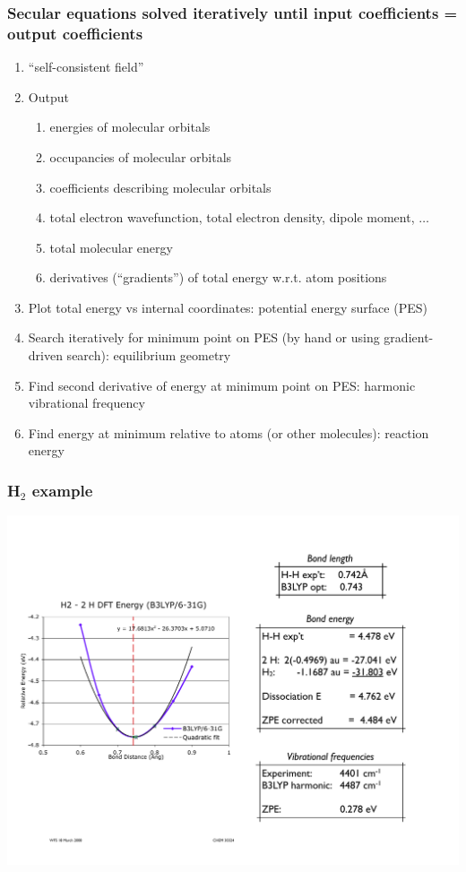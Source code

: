 \documentclass[11pt]{article}
\begin{document}
\subsubsection{Secular equations solved iteratively until input coefficients = output coefficients}
\label{sec:org75608ea}
\begin{enumerate}
\item ``self-consistent field''
\item Output
\begin{enumerate}
\item energies of molecular orbitals
\item occupancies of molecular orbitals
\item coefficients describing molecular orbitals
\item total electron wavefunction, total electron density, dipole moment, \(\ldots\)
\item total molecular energy
\item derivatives (``gradients'') of total energy w.r.t. atom positions
\end{enumerate}
\item Plot total energy vs internal coordinates: potential energy surface (PES)
\item Search iteratively for minimum point on PES (by hand or using gradient-driven search): equilibrium geometry
\item Find second derivative of energy at minimum point on PES: harmonic vibrational frequency
\item Find energy at minimum relative to atoms (or other molecules): reaction energy
\end{enumerate}
\subsubsection{H\(_2\) example}
\label{sec:org2b7efb9}
\begin{center}
  \includegraphics[scale=0.6]{Images/H2-PES}
\end{center}
\end{document}
